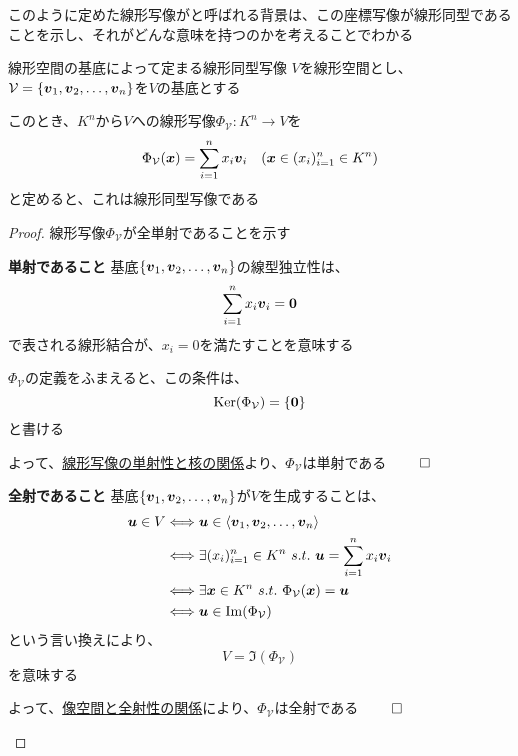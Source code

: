 \documentclass[../../../topic_linear-algebra]{subfiles}
\begin{document}
このように定めた線形写像がと呼ばれる背景は、この座標写像が線形同型であることを示し、それがどんな意味を持つのかを考えることでわかる

\begin{theorem}{線形空間の基底によって定まる線形同型写像}
  $V$を線形空間とし、$\mathcal{V} = \{ \vb*{v}_1, \vb*{v}_2, \dots, \vb*{v}_n \}$を$V$の基底とする

  このとき、$K^n$から$V$への線形写像$\Phi_{\mathcal{V}}\colon K^n \to V$を
  \begin{equation*}
    \Phi_{\mathcal{V}}(\vb*{x}) = \sum_{i=1}^n x_i \vb*{v}_i \quad (\vb*{x} \in (x_i)_{i=1}^n \in K^n)
  \end{equation*}
  と定めると、これは線形同型写像である
\end{theorem}

\begin{proof}
  線形写像$\Phi_{\mathcal{V}}$が全単射であることを示す

  \begin{subpattern}{\bfseries 単射であること}
    基底$\{ \vb*{v}_1, \vb*{v}_2, \dots, \vb*{v}_n \}$の線型独立性は、
    \begin{equation*}
      \sum_{i=1}^n x_i \vb*{v}_i = \vb*{0}
    \end{equation*}
    で表される線形結合が、$x_i = 0$を満たすことを意味する

    $\Phi_{\mathcal{V}}$の定義をふまえると、この条件は、
    \begin{equation*}
      \operatorname{Ker}(\Phi_{\mathcal{V}}) = \{ \vb*{0} \}
    \end{equation*}
    と書ける

    よって、\hyperref[thm:injective-iff-trivial-kernel]{線形写像の単射性と核の関係}より、$\Phi_{\mathcal{V}}$は単射である $\qed$
  \end{subpattern}

  \begin{subpattern}{\bfseries 全射であること}
    基底$\{ \vb*{v}_1, \vb*{v}_2, \dots, \vb*{v}_n \}$が$V$を生成することは、
    \begin{align*}
      \vb*{u} \in V & \Longleftrightarrow \vb*{u} \in \langle \vb*{v}_1, \vb*{v}_2, \dots, \vb*{v}_n \rangle           \\
                    & \Longleftrightarrow \exists (x_i)_{i=1}^n \in K^n \,\, s.t. \,\, \vb*{u} = \sum_{i=1}^n x_i \vb*{v}_i \\
                    & \Longleftrightarrow \exists \vb*{x} \in K^n \,\, s.t. \,\, \Phi_{\mathcal{V}}(\vb*{x}) = \vb*{u}      \\
                    & \Longleftrightarrow \vb*{u} \in \Im(\Phi_{\mathcal{V}})
    \end{align*}
    という言い換えにより、
    \begin{equation*}
      V = \Im(\Phi_{\mathcal{V}})
    \end{equation*}
    を意味する

    よって、\hyperref[sec:image-and-surjectivity]{像空間と全射性の関係}により、$\Phi_{\mathcal{V}}$は全射である $\qed$
  \end{subpattern}
\end{proof}
\end{document}
